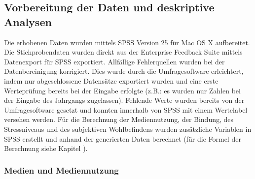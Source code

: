 \subsection{Vorbereitung der Daten und deskriptive Analysen}
Die erhobenen Daten wurden mittels SPSS Version 25 für Mac OS X aufbereitet. Die Stichprobendaten wurden direkt aus der Enterprise Feedback Suite \cite{Questback2018} mittels Datenexport für SPSS exportiert. Allfällige Fehlerquellen wurden bei der Datenbereinigung korrigiert. Dies wurde durch die Umfragesoftware erleichtert, indem nur abgeschlossene Datensätze exportiert wurden und eine erste Werteprüfung bereits bei der Eingabe erfolgte (z.B.: es wurden nur Zahlen bei der Eingabe des Jahrgangs zugelassen). Fehlende Werte wurden bereits von der Umfragesoftware gesetzt und konnten innerhalb von SPSS mit einem Wertelabel versehen werden. Für die Berechnung der Mediennutzung, der Bindung, des Stressniveaus und des subjektiven Wohlbefindens wurden zusätzliche Variablen in SPSS erstellt und anhand der generierten Daten berechnet (für die Formel der Berechnung siehe Kapitel ).

\subsubsection{Medien und Mediennutzung}

\begin{center}
\begin{minipage}{\linewidth}
    \centering
{}
\end{minipage}
\end{center}

